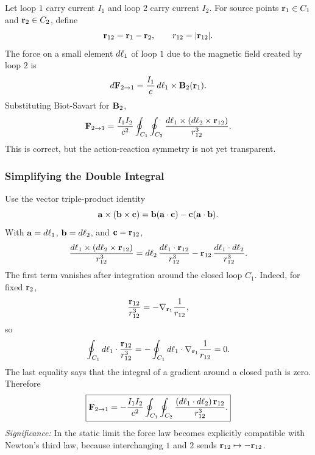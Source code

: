 Let loop $1$ carry current $I_1$ and loop $2$ carry current $I_2$.  For source points
$\mathbf{r}_1\in C_1$ and $\mathbf{r}_2\in C_2$, define
\begin{equation}\label{eq:lec14-r12-definition}
  \mathbf{r}_{12}=\mathbf{r}_1-\mathbf{r}_2,\qquad r_{12}=|\mathbf{r}_{12}|.
\end{equation}
The force on a small element $d\mathbf{\ell}_1$ of loop $1$ due to the magnetic field
created by loop $2$ is
\begin{equation}\label{eq:lec14-element-force}
  d\mathbf{F}_{2\to1}
  =\frac{I_1}{c}\,d\mathbf{\ell}_1\times\mathbf{B}_2(\mathbf{r}_1).
\end{equation}
Substituting Biot-Savart for $\mathbf{B}_2$,
\begin{equation}\label{eq:lec14-loop-force-unsimplified}
  \mathbf{F}_{2\to1}
  =\frac{I_1I_2}{c^2}
  \oint_{C_1}\oint_{C_2}
  \frac{d\mathbf{\ell}_1\times\left(d\mathbf{\ell}_2\times\mathbf{r}_{12}\right)}
       {r_{12}^3}.
\end{equation}
This is correct, but the action-reaction symmetry is not yet transparent.

\subsubsection*{Simplifying the Double Integral}
Use the vector triple-product identity
\begin{equation}\label{eq:lec14-triple-product}
  \mathbf{a}\times(\mathbf{b}\times\mathbf{c})
  = \mathbf{b}(\mathbf{a}\cdot\mathbf{c})
    - \mathbf{c}(\mathbf{a}\cdot\mathbf{b}).
\end{equation}
With $\mathbf{a}=d\mathbf{\ell}_1$, $\mathbf{b}=d\mathbf{\ell}_2$, and
$\mathbf{c}=\mathbf{r}_{12}$,
\begin{equation}\label{eq:lec14-loop-force-split}
  \frac{d\mathbf{\ell}_1\times(d\mathbf{\ell}_2\times\mathbf{r}_{12})}{r_{12}^3}
  =
  d\mathbf{\ell}_2\,
  \frac{d\mathbf{\ell}_1\cdot\mathbf{r}_{12}}{r_{12}^3}
  -
  \mathbf{r}_{12}\,
  \frac{d\mathbf{\ell}_1\cdot d\mathbf{\ell}_2}{r_{12}^3}.
\end{equation}
The first term vanishes after integration around the closed loop $C_1$.  Indeed,
for fixed $\mathbf{r}_2$,
\begin{equation}\label{eq:lec14-gradient-line-integral}
  \frac{\mathbf{r}_{12}}{r_{12}^3}
  = -\nabla_{\mathbf{r}_1}\frac{1}{r_{12}},
\end{equation}
so
\begin{equation}\label{eq:lec14-closed-gradient-zero}
  \oint_{C_1} d\mathbf{\ell}_1\cdot\frac{\mathbf{r}_{12}}{r_{12}^3}
  =
  -\oint_{C_1} d\mathbf{\ell}_1\cdot\nabla_{\mathbf{r}_1}\frac{1}{r_{12}}
  =0.
\end{equation}
The last equality says that the integral of a gradient around a closed path is zero.
Therefore
\begin{equation}\label{eq:lec14-loop-force-final}
  \boxed{
  \mathbf{F}_{2\to1}
  =-\frac{I_1I_2}{c^2}
  \oint_{C_1}\oint_{C_2}
  \frac{(d\mathbf{\ell}_1\cdot d\mathbf{\ell}_2)\,\mathbf{r}_{12}}{r_{12}^3}.
  }
\end{equation}
\textit{Significance:} In the static limit the force law becomes explicitly compatible
with Newton's third law, because interchanging $1$ and $2$ sends $\mathbf{r}_{12}\mapsto-\mathbf{r}_{12}$.

